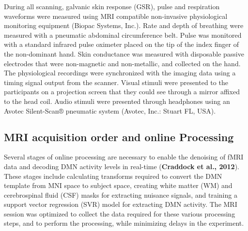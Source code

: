 During all scanning, galvanic skin response (GSR), pulse and respiration waveforms were measured using MRI compatible non-invasive physiological monitoring equipment (Biopac Systems, Inc.). Rate and depth of breathing were measured with a pneumatic abdominal circumference belt. Pulse was monitored with a standard infrared pulse oximeter placed on the tip of the index finger of the non-dominant hand. Skin conductance was measured with disposable passive electrodes that were non-magnetic and non-metallic, and collected on the hand. The physiological recordings were synchronized with the imaging data using a timing signal output from the scanner. Visual stimuli were presented to the participants on a projection screen that they could see through a mirror affixed to the head coil. Audio stimuli were presented through headphones using an Avotec Silent-Scan® pneumatic system (Avotec, Inc.: Stuart FL, USA).

\subsection{MRI acquisition order and online Processing}

Several stages of online processing are necessary to enable the denoising of fMRI data and decoding DMN activity levels in real-time (\textbf{Craddock et al., 2012}). These stages include calculating transforms required to convert the DMN template from MNI space to subject space, creating white matter (WM) and cerebrospinal fluid (CSF) masks for extracting nuisance signals, and training a support vector regression (SVR) model for extracting DMN activity. The MRI session was optimized to collect the data required for these various processing steps, and to perform the processing, while minimizing delays in the experiment.

